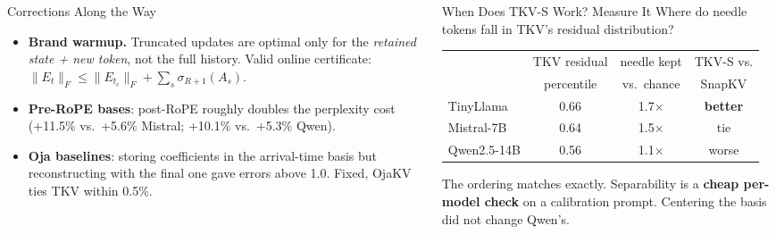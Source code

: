 \documentclass[final]{beamer}
\begin{document}
\begin{frame}[t]
\begin{columns}[t]
\begin{column}{0.305\paperwidth}
\begin{block}{Corrections Along the Way}
\begin{itemize}
  \item \textbf{Brand warmup.} Truncated updates are optimal only for the \emph{retained state + new token}, not the full history. Valid online certificate: $\lVert E_t\rVert_F \le \lVert E_{t_c}\rVert_F + \sum_s \sigma_{R+1}(A_s)$.
  \item \textbf{Pre-RoPE bases}: post-RoPE roughly doubles the perplexity cost (+11.5\% vs.\ +5.6\% Mistral; +10.1\% vs.\ +5.3\% Qwen).
  \item \textbf{Oja baselines}: storing coefficients in the arrival-time basis but reconstructing with the final one gave errors above 1.0. Fixed, OjaKV ties TKV within 0.5\%.
\end{itemize}
\end{block}

\end{column}

\begin{column}{0.305\paperwidth}

\begin{block}{When Does TKV-S Work? Measure It}
Where do needle tokens fall in TKV's residual distribution?
\vspace{0.3cm}
\begin{center}
\begin{tabular}{lccc}
\toprule
 & TKV residual & needle kept & TKV-S vs. \\
 & percentile & vs.\ chance & SnapKV \\
\midrule
TinyLlama & 0.66 & 1.7$\times$ & \textbf{\color{accent}better} \\
Mistral-7B & 0.64 & 1.5$\times$ & tie \\
Qwen2.5-14B & 0.56 & 1.1$\times$ & worse \\
\bottomrule
\end{tabular}
\end{center}
\vspace{0.1cm}
The ordering matches exactly. Separability is a \textbf{cheap per-model
check} on a calibration prompt. Centering the basis did not change Qwen's.
\end{block}


\end{column}
\end{columns}
\end{frame}
\end{document}
